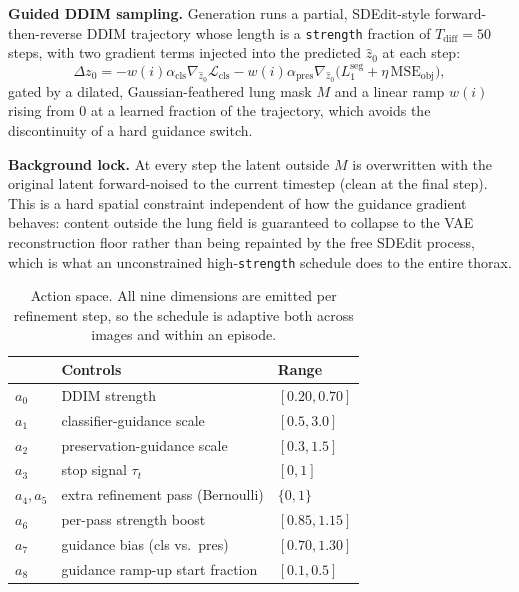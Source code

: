 \documentclass[10pt,twocolumn,letterpaper]{article}
\begin{document}
\textbf{Guided DDIM sampling.} Generation runs a partial, SDEdit-style
forward-then-reverse DDIM trajectory whose length is a \texttt{strength}
fraction of $T_{\text{diff}}=50$ steps, with two gradient terms injected
into the predicted $\hat z_0$ at each step:
\begin{equation}
\Delta z_0 = -w(i)\alpha_{\text{cls}}\nabla_{\hat z_0}\mathcal{L}_{\text{cls}}
- w(i)\alpha_{\text{pres}}\nabla_{\hat z_0}\big(L_1^{\text{seg}} + \eta\,\mathrm{MSE}_{\text{obj}}\big),
\label{eq:guidance}
\end{equation}
gated by a dilated, Gaussian-feathered lung mask $M$ and a linear ramp
$w(i)$ rising from $0$ at a learned fraction of the trajectory, which
avoids the discontinuity of a hard guidance switch.

\textbf{Background lock.} At every step the latent outside $M$ is
overwritten with the original latent forward-noised to the current
timestep (clean at the final step). This is a hard spatial constraint
independent of how the guidance gradient behaves: content outside the
lung field is guaranteed to collapse to the VAE reconstruction floor
rather than being repainted by the free SDEdit process, which is what an
unconstrained high-\texttt{strength} schedule does to the entire thorax.

\begin{table}[t]
\centering
\small
\caption{Action space. All nine dimensions are emitted per refinement
step, so the schedule is adaptive both across images and within an
episode.}
\label{tab:actionspace}
\begin{tabular}{@{}lll@{}}
\toprule
& \textbf{Controls} & \textbf{Range} \\
\midrule
$a_0$ & DDIM strength & $[0.20,0.70]$ \\
$a_1$ & classifier-guidance scale & $[0.5,3.0]$ \\
$a_2$ & preservation-guidance scale & $[0.3,1.5]$ \\
$a_3$ & stop signal $\tau_t$ & $[0,1]$ \\
$a_4,a_5$ & extra refinement pass (Bernoulli) & $\{0,1\}$ \\
$a_6$ & per-pass strength boost & $[0.85,1.15]$ \\
$a_7$ & guidance bias (cls vs.\ pres) & $[0.70,1.30]$ \\
$a_8$ & guidance ramp-up start fraction & $[0.1,0.5]$ \\
\bottomrule
\end{tabular}
\end{table}
\end{document}
